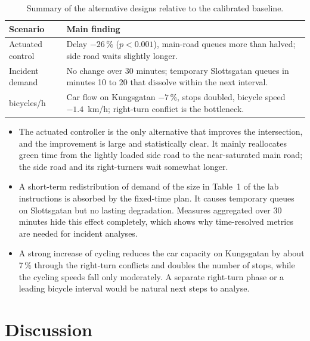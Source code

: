 \documentclass[11pt,a4paper]{article}
\newcommand{\kmh}{~km/h}
\begin{document}
\begin{table}[!htb]
\centering
\caption[Summary of the alternative designs]{Summary of the alternative designs relative to the
calibrated baseline.}
\label{tab:altsummary}
\small
\begin{tabularx}{\textwidth}{>{\raggedright\arraybackslash}p{2.6cm}X}
\toprule
\textbf{Scenario} & \textbf{Main finding}\\
\midrule
Actuated control & Delay $-26\,\%$ ($p<0.001$), main-road queues more than halved; side road
waits slightly longer.\\
Incident demand  & No change over 30 minutes; temporary Slottsgatan queues in minutes 10 to 20 that
dissolve within the next interval.\\
800 bicycles/h   & Car flow on Kungsgatan $-7\,\%$, stops doubled, bicycle speed $-1.4$\kmh;
right-turn conflict is the bottleneck.\\
\bottomrule
\end{tabularx}
\end{table}

\begin{itemize}
  \item The actuated controller is the only alternative that improves the intersection, and the
        improvement is large and statistically clear. It mainly reallocates green time from the
        lightly loaded side road to the near-saturated main road; the side road and its
        right-turners wait somewhat longer.
  \item A short-term redistribution of demand of the size in Table~1 of the lab instructions is
        absorbed by the fixed-time plan. It causes temporary queues on Slottsgatan but no lasting
        degradation. Measures aggregated over 30 minutes hide this effect completely, which shows
        why time-resolved metrics are needed for incident analyses.
  \item A strong increase of cycling reduces the car capacity on Kungsgatan by about 7\,\% through
        the right-turn conflicts and doubles the number of stops, while the cycling speeds fall
        only moderately. A separate right-turn phase or a leading bicycle interval would be natural
        next steps to analyse.
\end{itemize}

\section{Discussion}
\label{sec:discussion}
\end{document}
